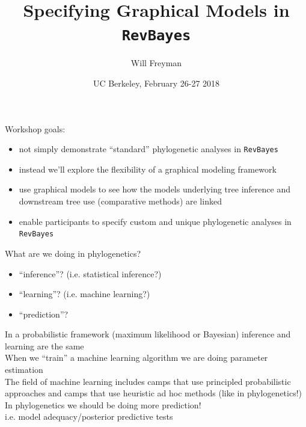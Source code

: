 \documentclass[mathserif]{beamer}
\title{Specifying Graphical Models in \texttt{RevBayes}}
\author{Will Freyman}
\institute{
  Department of Integrative Biology\\
  University of California, Berkeley\\
  \medskip
  \color{Emerald}freyman@berkeley.edu \\
  http://willfreyman.org

}
\date{UC Berkeley, February 26-27 2018}
\begin{document}
\frame{\titlepage}

\begin{frame}
    \begin{block}{Workshop goals:}
    \begin{itemize}
        \item not simply demonstrate ``standard'' phylogenetic analyses in \texttt{RevBayes}
        \item instead we'll explore the flexibility of a graphical modeling framework 
        \item use graphical models to see how the models underlying tree inference and downstream tree use (comparative methods) are linked
        \item enable participants to specify custom and unique phylogenetic analyses in \texttt{RevBayes}
    \end{itemize}
    \end{block}
\end{frame}


\begin{frame}
    \begin{block}{What are we doing in phylogenetics?}
    \begin{itemize}
        \item ``inference''? (i.e. statistical inference?)
        \item ``learning''? (i.e. machine learning?)
        \item ``prediction''?
    \end{itemize}
    \bigskip
        In a probabilistic framework (maximum likelihood or Bayesian) 
        inference and learning are the same\\
    \bigskip
        When we ``train'' a machine learning algorithm we are doing parameter estimation\\
    \bigskip
        The field of machine learning includes camps that use principled probabilistic approaches and camps that use heuristic ad hoc methods (like in phylogenetics!)\\
    \bigskip
        In phylogenetics we should be doing more \alert{prediction}! \\
    i.e. model adequacy/posterior predictive tests
    \end{block}
\end{frame}
\end{document}
